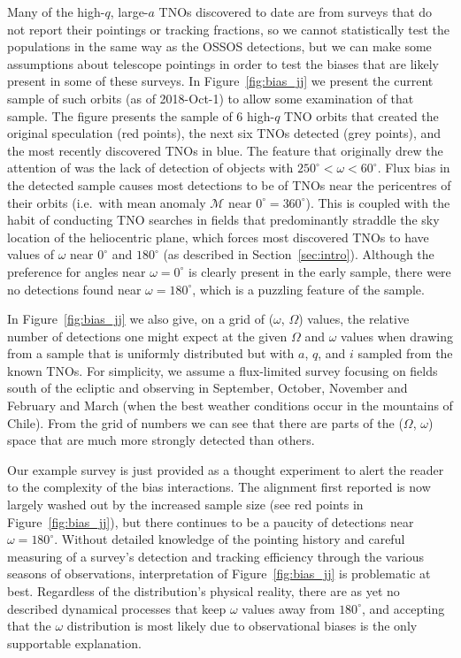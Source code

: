 \documentclass[preprint]{aastex62}
\begin{document}
Many of the high-$q$, large-$a$ TNOs discovered to date are from surveys that do not report their pointings or tracking fractions, so we cannot statistically test the populations in the same way as the OSSOS detections, but we can make some assumptions about telescope pointings in order to test the biases that are likely present in some of these surveys.
In Figure~\ref{fig:bias_jj} we present the current sample of such
orbits (as of 2018-Oct-1) to allow some examination of that sample.
The figure presents the sample of 6 high-$q$ TNO orbits that created the original
speculation (red points), the next six TNOs detected (grey
points), and the most recently discovered TNOs in blue.  The feature
that originally drew the attention of \citet{trujillosheppard14} was the lack of detection of
objects with $250^{\circ}< \omega < 60^{\circ}$.  Flux bias in the detected sample
causes most detections to be of TNOs near the pericentres of their
orbits (i.e.\ with mean anomaly $\mathcal{M}$ near $0^{\circ}=360^{\circ}$).  This is coupled with the
habit of conducting TNO searches in fields that predominantly
straddle the sky location of the heliocentric plane, which forces most
discovered TNOs to have values of $\omega$ near $0^{\circ}$ and $180^{\circ}$ (as described in Section~\ref{sec:intro}).
Although the preference for angles near $\omega=0^{\circ}$ is clearly present in the
early sample, there were no detections found near $\omega=180^{\circ}$, which is a puzzling feature of the sample.

In Figure~\ref{fig:bias_jj} we also give, on a grid of ($\omega$, $\Omega$) values, the relative
number of detections one might expect at the given $\Omega$ and
$\omega$ values when drawing from a sample that is uniformly
distributed but with $a$, $q$, and $i$ sampled from the known TNOs.
For simplicity, we assume a flux-limited survey focusing on fields south of the
ecliptic and observing in September, October, November and February
and March (when the best weather conditions occur in the mountains of Chile).  
From the grid of numbers we can see that there are parts
of the ($\Omega$, $\omega$) space that are much more strongly detected than others.  

Our
example survey is just provided as a thought experiment to alert the reader to the complexity of the bias interactions. 
The alignment first reported is now largely washed out by the increased sample size (see red points in Figure~\ref{fig:bias_jj}), but there continues to be a paucity of detections near $\omega = 180^{\circ}$.
Without detailed knowledge of the pointing history and careful measuring of a survey's detection and tracking efficiency through the various seasons of observations,
interpretation of Figure~\ref{fig:bias_jj} is problematic at best.  Regardless of the
distribution's physical reality, there are as yet no described dynamical
processes that keep $\omega$ values away from $180^{\circ}$, and
accepting that the $\omega$ distribution is most likely due to observational biases is
the only supportable explanation.
\end{document}
